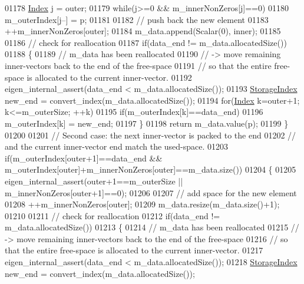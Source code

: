 \begin{DoxyCode}
01178     \hyperlink{group___core___module_a554f30542cc2316add4b1ea0a492ff02}{Index} j = outer;
01179     \textcolor{keywordflow}{while}(j>=0 && m\_innerNonZeros[j]==0)
01180       m\_outerIndex[j--] = p;
01181     
01182     \textcolor{comment}{// push back the new element}
01183     ++m\_innerNonZeros[outer];
01184     m\_data.append(Scalar(0), inner);
01185     
01186     \textcolor{comment}{// check for reallocation}
01187     \textcolor{keywordflow}{if}(data\_end != m\_data.allocatedSize())
01188     \{
01189       \textcolor{comment}{// m\_data has been reallocated}
01190       \textcolor{comment}{//  -> move remaining inner-vectors back to the end of the free-space}
01191       \textcolor{comment}{//     so that the entire free-space is allocated to the current inner-vector.}
01192       eigen\_internal\_assert(data\_end < m\_data.allocatedSize());
01193       \hyperlink{group___sparse_core___module_a0b540ba724726ebe953f8c0df06081ed}{StorageIndex} new\_end = convert\_index(m\_data.allocatedSize());
01194       \textcolor{keywordflow}{for}(\hyperlink{group___core___module_a554f30542cc2316add4b1ea0a492ff02}{Index} k=outer+1; k<=m\_outerSize; ++k)
01195         \textcolor{keywordflow}{if}(m\_outerIndex[k]==data\_end)
01196           m\_outerIndex[k] = new\_end;
01197     \}
01198     \textcolor{keywordflow}{return} m\_data.value(p);
01199   \}
01200   
01201   \textcolor{comment}{// Second case: the next inner-vector is packed to the end}
01202   \textcolor{comment}{// and the current inner-vector end match the used-space.}
01203   \textcolor{keywordflow}{if}(m\_outerIndex[outer+1]==data\_end && m\_outerIndex[outer]+m\_innerNonZeros[outer]==m\_data.size())
01204   \{
01205     eigen\_internal\_assert(outer+1==m\_outerSize || m\_innerNonZeros[outer+1]==0);
01206     
01207     \textcolor{comment}{// add space for the new element}
01208     ++m\_innerNonZeros[outer];
01209     m\_data.resize(m\_data.size()+1);
01210     
01211     \textcolor{comment}{// check for reallocation}
01212     \textcolor{keywordflow}{if}(data\_end != m\_data.allocatedSize())
01213     \{
01214       \textcolor{comment}{// m\_data has been reallocated}
01215       \textcolor{comment}{//  -> move remaining inner-vectors back to the end of the free-space}
01216       \textcolor{comment}{//     so that the entire free-space is allocated to the current inner-vector.}
01217       eigen\_internal\_assert(data\_end < m\_data.allocatedSize());
01218       \hyperlink{group___sparse_core___module_a0b540ba724726ebe953f8c0df06081ed}{StorageIndex} new\_end = convert\_index(m\_data.allocatedSize());

\end{DoxyCode}
